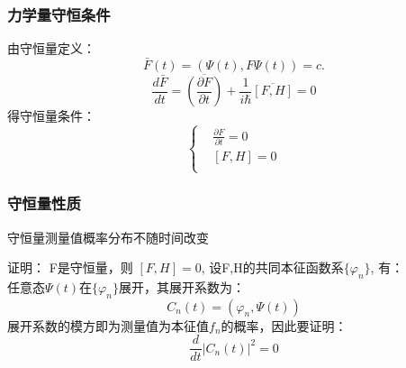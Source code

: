 \begin{frame} [allowframebreaks=]
        \frametitle{力学量守恒条件} 
        由守恒量定义：   
        $$ \bar{F}(t)=(\Psi(t), F\Psi(t)) =c.  $$
        $$\frac{d\bar{F}}{dt}=\overline{(\frac{\partial F }{\partial t})}  +\frac{1}{i\hbar} \overline{[F,H]}=0$$
        得守恒量条件：
        $$\left\{\begin{aligned}
            &\frac{\partial F }{\partial t}=0\\
            &[F,H]=0 \\
        \end{aligned} \right. $$
\end{frame}

\begin{frame} 
    \frametitle{守恒量性质} 
    \begin{tcolorbox}[colback=yellow!5,colframe=yellow!75!black,title=性质1：]
        守恒量测量值概率分布不随时间改变
    \end{tcolorbox}
    \alert{证明：} F是守恒量，则 $[F,H]=0$, 设F,H的共同本征函数系$\{\varphi_n\}$, 有：\\ 
    任意态$\Psi(t)$在$\{\varphi_n\}$展开，其展开系数为：
    $$C_n(t)=(\varphi_n, \Psi(t))$$
    展开系数的模方即为测量值为本征值$f_n$的概率，因此要证明：
    $$\frac{d}{dt} |C_n(t)|^2=0$$
\end{frame}

